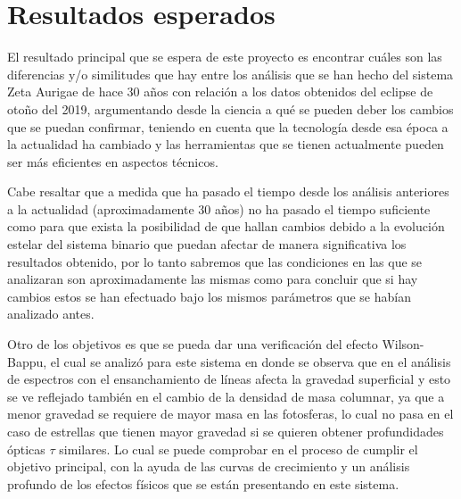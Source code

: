 \documentclass[11pt]{article}
\begin{document}

\section{Resultados esperados}

El resultado principal que se espera de este proyecto es encontrar cuáles son las diferencias y/o similitudes que hay entre los análisis que se han hecho del sistema Zeta Aurigae de hace 30 años con relación a los datos obtenidos del eclipse de otoño del 2019, argumentando desde la ciencia a qué se pueden deber los cambios que se puedan confirmar, teniendo en cuenta que la tecnología desde esa época a la actualidad ha cambiado y las herramientas que se tienen actualmente pueden ser más eficientes en aspectos técnicos.

Cabe resaltar que a medida que ha pasado el tiempo desde los análisis anteriores a la actualidad (aproximadamente 30 años) no ha pasado el  tiempo suficiente como para que exista la posibilidad de que hallan cambios debido a la evolución estelar del sistema binario que puedan afectar de manera significativa los resultados obtenido, por lo tanto sabremos que las condiciones en las que se analizaran son aproximadamente las mismas como para concluir que si hay cambios estos se han efectuado bajo los mismos parámetros que se habían analizado antes.

Otro de los objetivos es que se pueda dar una verificación del efecto Wilson-Bappu, el cual se analizó para este sistema en \cite{Dani} donde se observa que en el análisis de espectros con el ensanchamiento de líneas afecta la gravedad superficial y esto se ve reflejado también en el cambio de la densidad de masa columnar, ya que a menor gravedad se requiere de mayor masa en las fotosferas, lo cual  no pasa en el caso de estrellas que tienen mayor gravedad si se quieren obtener profundidades ópticas $\tau$ similares. Lo cual se puede comprobar en el proceso de cumplir el objetivo principal, con la ayuda de las curvas de crecimiento y un análisis profundo de los efectos físicos que se están presentando en este sistema.
\end{document}
